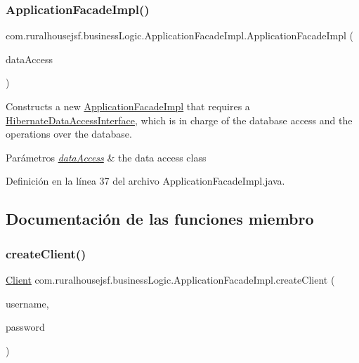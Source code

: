 \subsubsection{\texorpdfstring{ApplicationFacadeImpl()}{ApplicationFacadeImpl()}}
{\footnotesize\ttfamily com.\+ruralhousejsf.\+business\+Logic.\+Application\+Facade\+Impl.\+Application\+Facade\+Impl (\begin{DoxyParamCaption}\item[{\mbox{\hyperlink{interfacecom_1_1ruralhousejsf_1_1data_access_1_1_hibernate_data_access_interface}{Hibernate\+Data\+Access\+Interface}}}]{data\+Access }\end{DoxyParamCaption})}



Constructs a new \mbox{\hyperlink{classcom_1_1ruralhousejsf_1_1business_logic_1_1_application_facade_impl}{Application\+Facade\+Impl}} that requires a \mbox{\hyperlink{}{Hibernate\+Data\+Access\+Interface}}, which is in charge of the database access and the operations over the database. 


\begin{DoxyParams}{Parámetros}
{\em \mbox{\hyperlink{namespacecom_1_1ruralhousejsf_1_1data_access}{data\+Access}}} & the data access class \\
\hline
\end{DoxyParams}


Definición en la línea 37 del archivo Application\+Facade\+Impl.\+java.



\subsection{Documentación de las funciones miembro}
\mbox{\label{classcom_1_1ruralhousejsf_1_1business_logic_1_1_application_facade_impl_ae48e63f3df5226e46e4a57a64d120823}} 
\subsubsection{\texorpdfstring{createClient()}{createClient()}}
{\footnotesize\ttfamily \mbox{\hyperlink{classcom_1_1ruralhousejsf_1_1domain_1_1_client}{Client}} com.\+ruralhousejsf.\+business\+Logic.\+Application\+Facade\+Impl.\+create\+Client (\begin{DoxyParamCaption}\item[{String}]{username,  }\item[{String}]{password }\end{DoxyParamCaption})}



